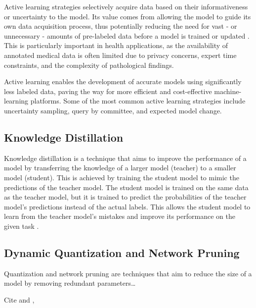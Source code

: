 \documentclass[../main.tex]{subfiles}
\begin{document}
     Active learning strategies selectively acquire data based on their informativeness or uncertainty to the model. Its value comes from allowing the model to guide its own data acquisition process, thus potentially reducing the need for vast - or unnecessary - amounts of pre-labeled data before a model is trained or updated \cite{huyen_designing_2022, chen_study_2015, figueroa_predicting_2012}. 
     This is particularly important in health applications, as the availability of annotated medical data is often limited due to privacy concerns, expert time constraints, and the complexity of pathological findings.
     
     Active learning enables the development of accurate models using significantly less labeled data, paving the way for more efficient and cost-effective machine-learning platforms. Some of the most common active learning strategies include uncertainty sampling, query by committee, and expected model change. 

     \subsection{Knowledge Distillation} \label{sec:knowledge_distillation} 

    Knowledge distillation is a technique that aims to improve the performance of a model by transferring the knowledge of a larger model (teacher) to a smaller model (student). This is achieved by training the student model to mimic the predictions of the teacher model. The student model is trained on the same data as the teacher model, but it is trained to predict the probabilities of the teacher model's predictions instead of the actual labels. This allows the student model to learn from the teacher model's mistakes and improve its performance on the given task \cite{hinton_distilling_2015}.
    

    \subsection{Dynamic Quantization and Network Pruning} \label{sec:dynamic_quantization_pruning_sparsification} 

    Quantization and network pruning are techniques that aim to reduce the size of a model by removing redundant parameters\dots

    Cite \cite{carreira-perpinan_model_2017} and \cite{han_deep_2016}, \cite{carreira-perpinan_compression_2018}
\end{document}
